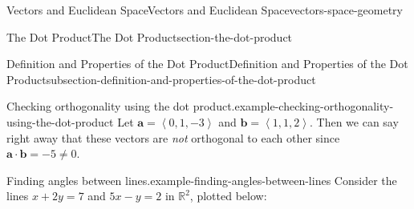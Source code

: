 \documentclass[oneside,10pt,]{book}
\numberwithin{equation}{section}
\newcommand{\RR}{\mathbb{R}}
\newcommand{\vv}[1]{\mathbf{#1}}
\newcommand{\dotprod}[1]{\left\langle #1 \right\rangle}
\begin{document}
\begin{chapterptx}{Vectors and Euclidean Space}{}{Vectors and Euclidean Space}{}{}{vectors-space-geometry}
\begin{sectionptx}{The Dot Product}{}{The Dot Product}{}{}{section-the-dot-product}
\begin{subsectionptx}{Definition and Properties of the Dot Product}{}{Definition and Properties of the Dot Product}{}{}{subsection-definition-and-properties-of-the-dot-product}
\begin{example}{Checking orthogonality using the dot product.}{example-checking-orthogonality-using-the-dot-product}
Let \(\vv{a} = \dotprod{0,1,-3}\) and \(\vv{b} = \dotprod{1,1,2}.\) Then we can say right away that these vectors are \emph{not} orthogonal to each other since \(\vv{a}\cdot\vv{b} = -5 \neq 0\).%
\end{example}
\begin{example}{Finding angles between lines.}{example-finding-angles-between-lines}%
\hypertarget{p-1148}{}%
Consider the lines \(x+2y = 7\) and \(5x-y = 2\) in \(\RR^{2}\), plotted below:%
\begin{figure}
\centering
{
}
\end{figure}
\end{example}
\end{subsectionptx}
\end{sectionptx}
\end{chapterptx}
\end{document}
